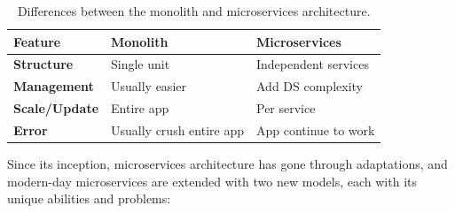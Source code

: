 \begin{table}[h!]
	\begin{center}
		\begin{tabular}{l|l|l}
			\textbf{Feature} & \textbf{Monolith} & \textbf{Microservices}\\
			\hline
			\textbf{Structure} & Single unit & Independent services \\
			\textbf{Management} & Usually easier & Add DS complexity\\
			\textbf{Scale/Update} & Entire app & Per service \\
			\textbf{Error} & Usually crush entire app & App continue to work \\
		\end{tabular}
	\end{center}
	\vspace{-0.5cm}
	\caption{Differences between the monolith and microservices architecture.}
	\label{tab:table3}
\end{table}

\noindent
Since its inception, microservices architecture has gone through adaptations, and modern-day microservices are extended with two new models, each with its unique abilities and problems:

